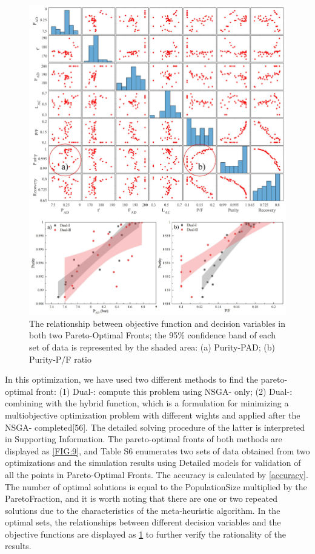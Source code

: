 \documentclass[preprint,12pt]{elsarticle}
\begin{document}
\begin{figure}
	\centering
	\includegraphics[width=1\textwidth]{figs/Fig10.pdf}
	\caption{The relationship between objective function and decision variables in both two Pareto-Optimal Fronts; the 95\% confidence band of each set of data is represented by the shaded area: (a) Purity-PAD; (b) Purity-P/F ratio}
	\label{FIG:10}
\end{figure}
In this optimization, we have used two different methods to find the pareto-optimal front: (1) Dual-\uppercase\expandafter{}: compute this problem using NSGA-\uppercase\expandafter{} only; (2) Dual-\uppercase\expandafter{}: combining with the hybrid function, which is a formulation for minimizing a multiobjective optimization problem with different wights and applied after the NSGA-\uppercase\expandafter{} completed[56]. The detailed solving procedure of the latter is interpreted in Supporting Information. The pareto-optimal fronts of both methods are displayed as \cref{FIG:9}, and Table S6 enumerates two sets of data obtained from two optimizations and the simulation results using Detailed models for validation of all the points in Pareto-Optimal Fronts. The accuracy is calculated by \cref{accuracy}. The number of optimal solutions is equal to the PopulationSize multiplied by the ParetoFraction, and it is worth noting that there are one or two repeated solutions due to the characteristics of the meta-heuristic algorithm. In the optimal sets, the relationships between different decision variables and the objective functions are displayed as \cref{FIG:10} to further verify the rationality of the results.
\end{document}
